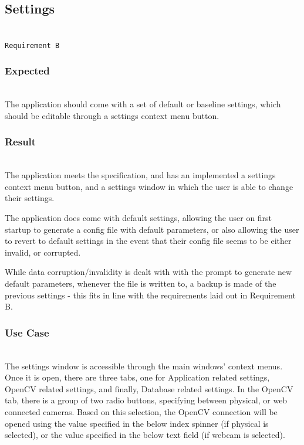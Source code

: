 \documentclass[conference]{IEEEtran}
\begin{document}
\newpage
\subsection{Settings}~\\
\texttt{Requirement B}~\\
\subsubsection{Expected}~\\
The application should come with a set of default or baseline settings, which should be editable through a settings context menu button.~\\

\subsubsection{Result}~\\
The application meets the specification, and has an implemented a settings context menu button, and a settings window in which the user is able to change their settings.

The application does come with default settings, allowing the user on first startup to generate a config file with default parameters, or also allowing the user to revert to default settings in the event that their config file seems to be either invalid, or corrupted.

While data corruption/invalidity is dealt with with the prompt to generate new default parameters, whenever the file is written to, a backup is made of the previous settings - this fits in line with the requirements laid out in Requirement B.~\\

\subsubsection{Use Case}~\\
The settings window is accessible through the main windows' context menus. Once it is open, there are three tabs, one for Application related settings, OpenCV related settings, and finally, Database related settings. In the OpenCV tab, there is a group of two radio buttons, specifying between physical, or web connected cameras. Based on this selection, the OpenCV connection will be opened using the value specified in the below index spinner (if physical is selected), or the value specified in the below text field (if webcam is selected).\\
\end{document}

